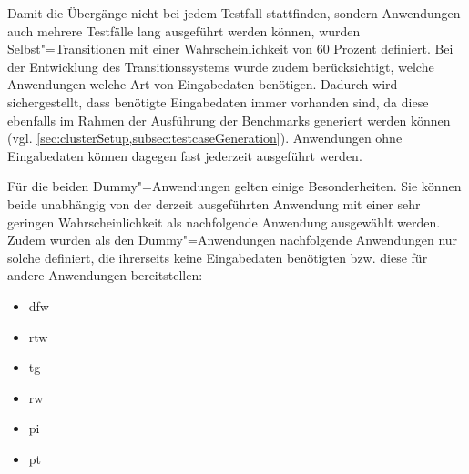 Damit die Übergänge nicht bei jedem Testfall stattfinden, sondern Anwendungen auch mehrere Testfälle lang ausgeführt werden können, wurden Selbst"=Transitionen mit einer Wahrscheinlichkeit von 60 Prozent definiert.
Bei der Entwicklung des Transitionssystems wurde zudem berücksichtigt, welche Anwendungen welche Art von Eingabedaten benötigen.
Dadurch wird sichergestellt, dass benötigte Eingabedaten immer vorhanden sind, da diese ebenfalls im Rahmen der Ausführung der Benchmarks generiert werden können (vgl. \cref{sec:clusterSetup,subsec:testcaseGeneration}).
Anwendungen ohne Eingabedaten können dagegen fast jederzeit ausgeführt werden.

Für die beiden Dummy"=Anwendungen gelten einige Besonderheiten.
Sie können beide unabhängig von der derzeit ausgeführten Anwendung mit einer sehr geringen Wahrscheinlichkeit als nachfolgende Anwendung ausgewählt werden.
Zudem wurden als den Dummy"=Anwendungen nachfolgende Anwendungen nur solche definiert, die ihrerseits keine Eingabedaten benötigten bzw. diese für andere Anwendungen bereitstellen:

\begin{itemize}
\item \acrlong{dfw}
\item \acrlong{rtw}
\item \acrlong{tg}
\item \acrlong{rw}
\item \acrlong{pi}
\item \acrlong{pt}
\end{itemize}
